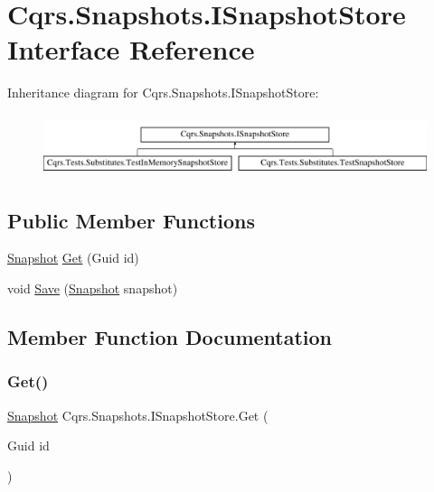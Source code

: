 \hypertarget{interfaceCqrs_1_1Snapshots_1_1ISnapshotStore}{}\section{Cqrs.\+Snapshots.\+I\+Snapshot\+Store Interface Reference}
\label{interfaceCqrs_1_1Snapshots_1_1ISnapshotStore}
Inheritance diagram for Cqrs.\+Snapshots.\+I\+Snapshot\+Store\+:\begin{figure}[H]
\begin{center}
\leavevmode
\includegraphics[height=1.818182cm]{interfaceCqrs_1_1Snapshots_1_1ISnapshotStore}
\end{center}
\end{figure}
\subsection*{Public Member Functions}
\begin{DoxyCompactItemize}
\item 
\hyperlink{classCqrs_1_1Snapshots_1_1Snapshot}{Snapshot} \hyperlink{interfaceCqrs_1_1Snapshots_1_1ISnapshotStore_a08af77cd80a9134f17033a479325330c_a08af77cd80a9134f17033a479325330c}{Get} (Guid id)
\item 
void \hyperlink{interfaceCqrs_1_1Snapshots_1_1ISnapshotStore_a6e99c620115ce8a0648a83bf2ce05527_a6e99c620115ce8a0648a83bf2ce05527}{Save} (\hyperlink{classCqrs_1_1Snapshots_1_1Snapshot}{Snapshot} snapshot)
\end{DoxyCompactItemize}


\subsection{Member Function Documentation}
\mbox{\label{interfaceCqrs_1_1Snapshots_1_1ISnapshotStore_a08af77cd80a9134f17033a479325330c_a08af77cd80a9134f17033a479325330c}} 
\subsubsection{\texorpdfstring{Get()}{Get()}}
{\footnotesize\ttfamily \hyperlink{classCqrs_1_1Snapshots_1_1Snapshot}{Snapshot} Cqrs.\+Snapshots.\+I\+Snapshot\+Store.\+Get (\begin{DoxyParamCaption}\item[{Guid}]{id }\end{DoxyParamCaption})}



